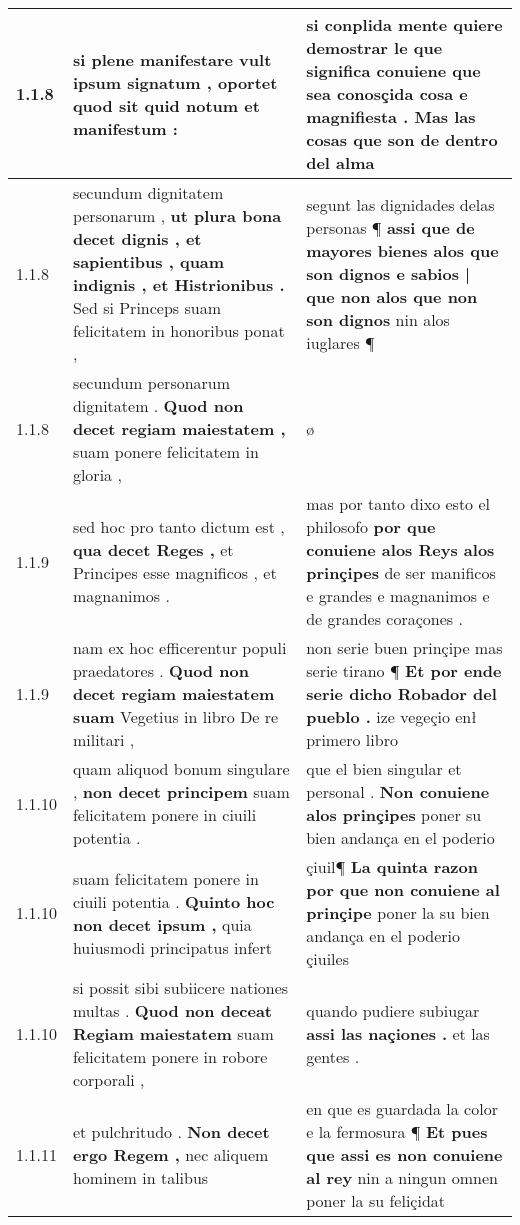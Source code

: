 \begin{tabular}{|p{1cm}|p{6.5cm}|p{6.5cm}|}
1.1.8 & si plene manifestare vult ipsum signatum , \textbf{ oportet quod sit } quid notum et manifestum : & si conplida mente quiere demostrar le que significa \textbf{ conuiene que sea conosçida cosa e magnifiesta . } Mas las cosas que son de dentro del alma \\\hline
1.1.8 & secundum dignitatem personarum , \textbf{ ut plura bona decet dignis , et sapientibus , quam indignis , et Histrionibus . } Sed si Princeps suam felicitatem in honoribus ponat , & segunt las dignidades delas personas ¶ \textbf{ assi que de mayores bienes alos que son dignos e sabios | que non alos que non son dignos } nin alos iuglares ¶ \\\hline
1.1.8 & secundum personarum dignitatem . \textbf{ Quod non decet regiam maiestatem , } suam ponere felicitatem in gloria , & ø \\\hline
1.1.9 & sed hoc pro tanto dictum est , \textbf{ qua decet Reges , } et Principes esse magnificos , et magnanimos . & mas por tanto dixo esto el philosofo \textbf{ por que conuiene alos Reys alos prinçipes } de ser manificos e grandes e magnanimos e de grandes coraçones . \\\hline
1.1.9 & nam ex hoc efficerentur populi praedatores . \textbf{ Quod non decet regiam maiestatem suam } Vegetius in libro De re militari , & non serie buen prinçipe mas serie tirano ¶ \textbf{ Et por ende serie dicho Robador del pueblo . } ize vegeçio enł primero libro \\\hline
1.1.10 & quam aliquod bonum singulare , \textbf{ non decet principem } suam felicitatem ponere in ciuili potentia . & que el bien singular et personal . \textbf{ Non conuiene alos prinçipes } poner su bien andança en el poderio \\\hline
1.1.10 & suam felicitatem ponere in ciuili potentia . \textbf{ Quinto hoc non decet ipsum , } quia huiusmodi principatus infert & çiuil¶ \textbf{ La quinta razon por que non conuiene al prinçipe } poner la su bien andança en el poderio çiuiles \\\hline
1.1.10 & si possit sibi subiicere nationes multas . \textbf{ Quod non deceat Regiam maiestatem } suam felicitatem ponere in robore corporali , & quando pudiere subiugar \textbf{ assi las naçiones . } et las gentes . \\\hline
1.1.11 & et pulchritudo . \textbf{ Non decet ergo Regem , } nec aliquem hominem in talibus & en que es guardada la color e la fermosura ¶ \textbf{ Et pues que assi es non conuiene al rey } nin a ningun omnen poner la su feliçidat \\\hline

\end{tabular}

